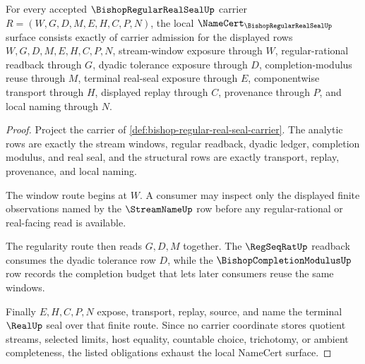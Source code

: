 \begin{theorem}
\label{thm:bishop-regular-real-seal-namecert-obligations}
For every accepted $\BishopRegularRealSealUp$ carrier $R=(W,G,D,M,E,H,C,P,N)$, the local $\NameCert_{\BishopRegularRealSealUp}$ surface consists exactly of carrier admission for the displayed rows $W,G,D,M,E,H,C,P,N$, stream-window exposure through $W$, regular-rational readback through $G$, dyadic tolerance exposure through $D$, completion-modulus reuse through $M$, terminal real-seal exposure through $E$, componentwise transport through $H$, displayed replay through $C$, provenance through $P$, and local naming through $N$.
\end{theorem}
\begin{proof}
Project the carrier of \autoref{def:bishop-regular-real-seal-carrier}. The analytic rows are exactly the stream windows, regular readback, dyadic ledger, completion modulus, and real seal, and the structural rows are exactly transport, replay, provenance, and local naming.

The window route begins at $W$. A consumer may inspect only the displayed finite observations named by the $\StreamNameUp$ row before any regular-rational or real-facing read is available.

The regularity route then reads $G,D,M$ together. The $\RegSeqRatUp$ readback consumes the dyadic tolerance row $D$, while the $\BishopCompletionModulusUp$ row records the completion budget that lets later consumers reuse the same windows.

Finally $E,H,C,P,N$ expose, transport, replay, source, and name the terminal $\RealUp$ seal over that finite route. Since no carrier coordinate stores quotient streams, selected limits, host equality, countable choice, trichotomy, or ambient completeness, the listed obligations exhaust the local NameCert surface.
\end{proof}

